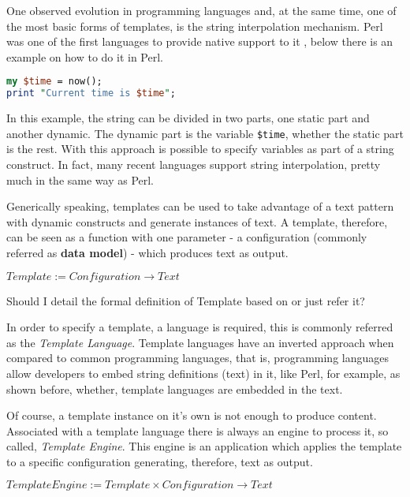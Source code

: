 \begin{itemize}
One observed evolution in programming languages and, at the same time, one of the most basic forms of templates, is the string interpolation mechanism. Perl was one of the first languages to provide native support to it \cite{Wall2000ProgrammingPerl}, below there is an example on how to do it in Perl.

\begin{lstlisting}[language=Perl]
my $time = now();
print "Current time is $time";
\end{lstlisting}

In this example, the string can be divided in two parts, one static part and another dynamic. The dynamic part is the variable \texttt{\$time}, whether the static part is the rest. With this approach is possible to specify variables as part of a string construct. In fact, many recent languages support string interpolation, pretty much in the same way as Perl. 

Generically speaking, templates can be used to take advantage of a text pattern with dynamic constructs and generate instances of text. A template, therefore, can be seen as a function with one parameter - a configuration (commonly referred as \textbf{data model}) - which produces text as output. 

\begin{center}
$Template := Configuration \rightarrow Text$
\end{center}

\begin{orientador}
    Should I detail the formal definition of Template based on \cite{Parr2004EnforcingEngines} or just refer it?
\end{orientador}

In order to specify a template, a language is required, this is commonly referred as the \textit{Template Language}. Template languages have an inverted approach when compared to common programming languages, that is, programming languages allow developers to embed string definitions (text) in it, like Perl, for example, as shown before, whether, template languages are embedded in the text.

Of course, a template instance on it's own is not enough to produce content. Associated with a template language there is always an engine to process it, so called, \textit{Template Engine}. This engine is an application which applies the template to a specific configuration generating, therefore, text as output.

\begin{center}
    $TemplateEngine := Template \times Configuration \rightarrow Text$
\end{center}


\end{itemize}
